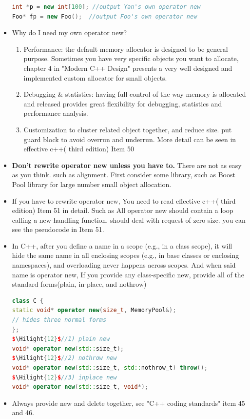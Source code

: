 \documentclass[a4paper,12pt,twoside]{book}
\newcommand{\Hilight}[1]{\makebox[0pt][l]{\color{yellow}\rule[-3pt]{#1em}{11pt}}}
\begin{document}
\begin{itemize}
\begin{lstlisting}[frame=single, language=c++, mathescape=true]
int *p = new int[100]; //output Yan's own operator new
Foo* fp = new Foo();  //output Foo's own operator new
\end{lstlisting}

\item Why do I need my own operator new?
\begin{enumerate}
\item Performance: the default memory allocator is designed to be general purpose. Sometimes you have very specific objects you want to allocate, chapter 4 in "Modern C++ Design" presents a very well designed and implemented custom allocator for small objects.

\item Debugging \& statistics: having full control of the way memory is allocated and released provides great flexibility for debugging, statistics and performance analysis.

\item Customization to cluster related object together, and reduce size. put guard block to avoid overrun and underrun. More detail can be seen in effective c++( third edition) Item 50
\end{enumerate}

\item \textbf{Don't rewrite operator new unless you have to.} There are not as easy as you think. such as alignment. First consider some library, such as Boost Pool library for large number small object allocation.

\item If you have to rewrite operator new, You need to read  effective c++( third edition) Item 51 in detail. Such as All operator new should contain a loop calling a new-handling function.  should deal with request of zero size. you can see the pseudocode in Item 51.



\item In C++, after you define a name in a scope (e.g., in a class scope), it will hide the same name in all enclosing scopes (e.g., in base classes or enclosing namespaces), and overloading never happens across scopes. And when said name is operator new, If you provide any class-specific new, provide all of the standard forms(plain, in-place, and nothrow)
\begin{lstlisting}[frame=single, language=c++, mathescape=true]
class C {
static void* operator new(size_t, MemoryPool&);
// hides three normal forms
};
$\Hilight{12}$//1) plain new
void* operator new(std::size_t);
$\Hilight{12}$//2) nothrow new
void* operator new(std::size_t, std::nothrow_t) throw();
$\Hilight{12}$//3) inplace new
void* operator new(std::size_t, void*);
\end{lstlisting}

\item Always provide new and delete together, see "C++ coding standards" item 45 and 46.
\end{itemize}
\end{document}
